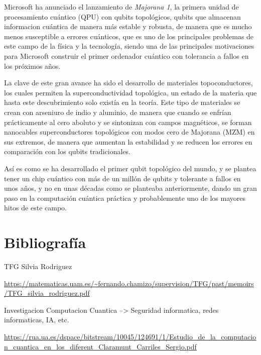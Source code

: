 \documentclass{article}
\numberwithin{equation}{section} %
\begin{document}
    \vspace{5mm}

    Microsoft ha anunciado el lanzamiento de \textit{Majorana 1}, la primera unidad de procesamiento cuántico (QPU) con qubits topológicos, qubits que almacenan informacion cuántica de manera más estable y robusta, de manera que es mucho menos susceptible a errores cuánticos, que es uno de los principales problemas de este campo de la física y la tecnología, siendo una de las principales motivaciones para Microsoft construir el primer ordenador cuántico con tolerancia a fallos en los próximos años.

    \vspace{5mm}

    La clave de este gran avance ha sido el desarrollo de materiales topoconductores, los cuales permiten la superconductividad topológica, un estado de la materia que hasta este descubrimiento solo existía en la teoría. Este tipo de materiales se crean con arseniuro de indio y aluminio, de manera que cuando se enfrían prácticamente al cero aboluto y se sintonizan con campos magnéticos, se forman nanocables superconductores topológicos con modos cero de Majorana (MZM) en sus extremos, de manera que aumentan la estabilidad y se reducen los errores en comparación con los qubits tradicionales.
    \vspace{5mm}

    Así es como se ha desarrollado el primer qubit topológico del mundo, y se plantea tener un chip cuántico con más de un millón de qubits y tolerante a fallos en unos años, y no en unas décadas como se planteaba anteriormente, dando un gran paso en la computación cuántica práctica y probablemente uno de los mayores hitos de este campo.

    \newpage
    \thispagestyle{empty}
    \mbox{}
    \newpage

    \section{Bibliografía}

        \vspace{5mm}

        TFG Silvia Rodriguez\par
        \url{https://matematicas.uam.es/~fernando.chamizo/supervision/TFG/past/memoirs/TFG\_silvia\_rodriguez.pdf}
        \vspace{2mm}

        Investigacion Computacion Cuantica --> Seguridad informatica, redes informaticas, IA, etc.\par
        \url{https://rua.ua.es/dspace/bitstream/10045/124691/1/Estudio\_de\_la\_computacion\_cuantica\_en\_los\_diferent\_Claramunt\_Carriles\_Sergio.pdf}
        \vspace{2mm}
\end{document}
